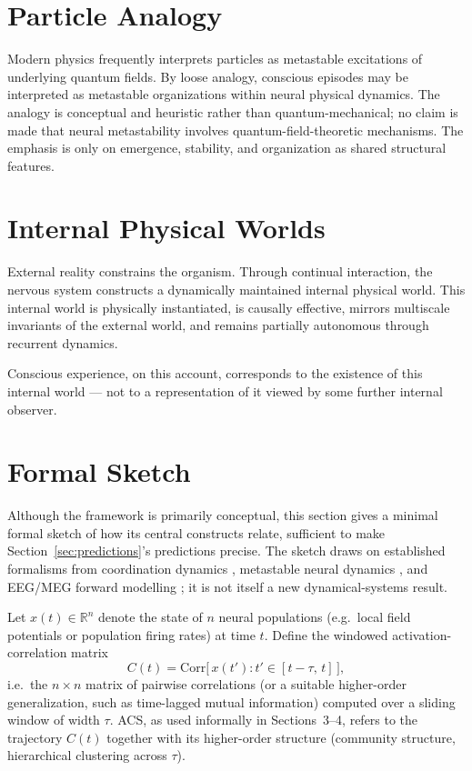 \documentclass[11pt]{article}
\begin{document}
\section{Particle Analogy}

Modern physics frequently interprets particles as metastable excitations of underlying quantum fields. By loose analogy, conscious episodes may be interpreted as metastable organizations within neural physical dynamics. The analogy is conceptual and heuristic rather than quantum-mechanical; no claim is made that neural metastability involves quantum-field-theoretic mechanisms. The emphasis is only on emergence, stability, and organization as shared structural features.

\section{Internal Physical Worlds}

External reality constrains the organism. Through continual interaction, the nervous system constructs a dynamically maintained internal physical world. This internal world is physically instantiated, is causally effective, mirrors multiscale invariants of the external world, and remains partially autonomous through recurrent dynamics.

Conscious experience, on this account, corresponds to the existence of this internal world --- not to a representation of it viewed by some further internal observer.

\section{Formal Sketch}
\label{sec:formal}

Although the framework is primarily conceptual, this section gives a minimal formal sketch of how its central constructs relate, sufficient to make Section~\ref{sec:predictions}'s predictions precise. The sketch draws on established formalisms from coordination dynamics \citep*{kelso1995}, metastable neural dynamics \citep*{rabinovich2008}, and EEG/MEG forward modelling \citep*{nunez2006}; it is not itself a new dynamical-systems result.

Let $x(t) \in \mathbb{R}^n$ denote the state of $n$ neural populations (e.g.\ local field potentials or population firing rates) at time $t$. Define the windowed activation-correlation matrix
\begin{equation}
C(t) = \mathrm{Corr}\big[\, x(t') : t' \in [t-\tau,\, t] \,\big],
\end{equation}
i.e.\ the $n \times n$ matrix of pairwise correlations (or a suitable higher-order generalization, such as time-lagged mutual information) computed over a sliding window of width $\tau$. ACS, as used informally in Sections~3--4, refers to the trajectory $C(t)$ together with its higher-order structure (community structure, hierarchical clustering across $\tau$).
\end{document}
